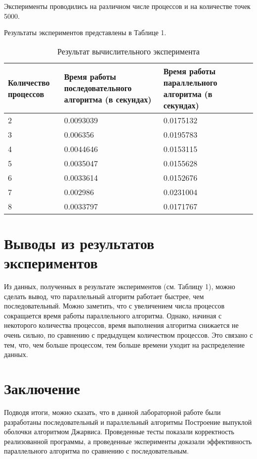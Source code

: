 \documentclass{report}
\begin{document}
\par Эксперименты проводились на различном числе процессов и на количестве точек 5000.

\par Результаты экспериментов представлены в Таблице 1.

\begin{table}[!h]
\caption{Результат вычислительного эксперимента}
\centering
\begin{tabular}{| p{2cm} | p{3cm} | p{4cm} | p{2cm} |}
\hline
Количество процессов & Время работы последовательного алгоритма (в секундах) & Время работы параллельного алгоритма (в секундах)  \\[5pt]
\hline
2        & 0.0093039        & 0.0175132            \\
3        & 0.006356         & 0.0195783            \\
4        & 0.0044646        & 0.0153115            \\
5        & 0.0035047        & 0.0155628            \\
6        & 0.0033614        & 0.0152676            \\
7        & 0.002986         & 0.0231004            \\
8        & 0.0033797        & 0.0171767            \\

\hline
\end{tabular}
\end{table}

\newpage

\section*{Выводы из результатов экспериментов}
Из данных, полученных в результате экспериментов (см. Таблицу 1), можно сделать вывод, что параллельный алгоритм работает быстрее, чем последовательный. Можно заметить, что с увеличением числа процессов сокращается время работы параллельного алгоритма. Однако, начиная с некоторого количества процессов, время выполнения алгоритма снижается не очень сильно, по сравнению с предыдущем количеством процессов. Это связано с тем, что, чем больше процессом, тем больше времени уходит на распределение данных. 

\newpage

\section*{Заключение}
Подводя итоги, можно сказать, что в данной лабораторной работе были разработаны последовательный и параллельный алгоритмы Построение выпуклой оболочки алгоритмом Джарвиса. Проведенные тесты показали корректность реализованной программы, а проведенные эксперименты доказали эффективность параллельного алгоритма по сравнению с последовательным.
\newpage
\end{document}
